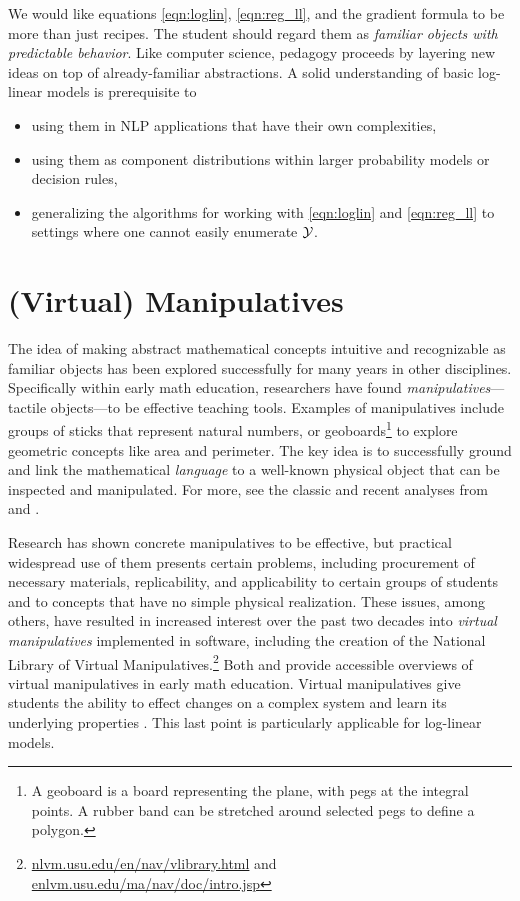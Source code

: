 \documentclass[11pt,letterpaper]{article}
\newcommand{\Note}[1]{}
\renewcommand{\Note}[1]{\hl{[#1]}}  %
\newcommand{\NoteSigned}[3]{{\sethlcolor{#2}\Note{#1: #3}}}
\newcommand{\NoteFF}[1]{\NoteSigned{FF}{LightBlue}{#1}}
\newcommand{\NoteJE}[1]{\NoteSigned{JE}{LightGreen}{#1}}
\begin{document}
We would like equations \eqref{eqn:loglin}, \eqref{eqn:reg_ll}, and the
gradient formula to be more than just recipes.  The student should
regard them as {\em familiar objects with predictable behavior}.  Like
computer science, pedagogy proceeds by layering new ideas on top of
already-familiar abstractions.  A solid understanding of basic
log-linear models is prerequisite to 
\begin{itemize}
\item using them in NLP applications that have their own complexities, 
\item using them as component distributions within larger probability
  models or decision rules,
\item generalizing the algorithms for working with \eqref{eqn:loglin}
  and \eqref{eqn:reg_ll} to settings where one cannot easily enumerate
  ${\cal Y}$.
\end{itemize}
  
\section{(Virtual) Manipulatives}
The idea of making abstract mathematical concepts intuitive and recognizable as familiar objects 
has been explored successfully for many years in other disciplines. Specifically within early 
math education, researchers have found \textit{manipulatives}---tactile
objects---to be effective teaching tools. Examples of manipulatives include groups of 
sticks that represent natural numbers, or geoboards\footnote{A
  geoboard is a board representing the plane, with pegs at the integral points.  A rubber
  band can be stretched around selected pegs to define a polygon.}
to explore geometric concepts like area and perimeter. The key idea is to 
successfully ground and link the mathematical \textit{language} to a well-known physical 
object that can be inspected and manipulated.  For more, see the classic and recent analyses from
 and .

Research has shown concrete manipulatives to be effective, but practical widespread use of them presents certain 
problems, including procurement of necessary materials, replicability,
and applicability to certain groups of students and to concepts
that have no simple physical realization. These issues, among others, have 
resulted in increased interest over the past two decades into
\textit{virtual manipulatives} implemented in software, including the creation of 
the National Library of Virtual Manipulatives.\footnote{\url{nlvm.usu.edu/en/nav/vlibrary.html} and 
\url{enlvm.usu.edu/ma/nav/doc/intro.jsp}} 
Both  and  provide accessible overviews of 
virtual manipulatives in early math education. 
Virtual manipulatives give students the ability to effect changes on a complex system and learn its underlying 
properties \cite{moyer2002virtual}. This last point is particularly applicable for log-linear models.
\end{document}
